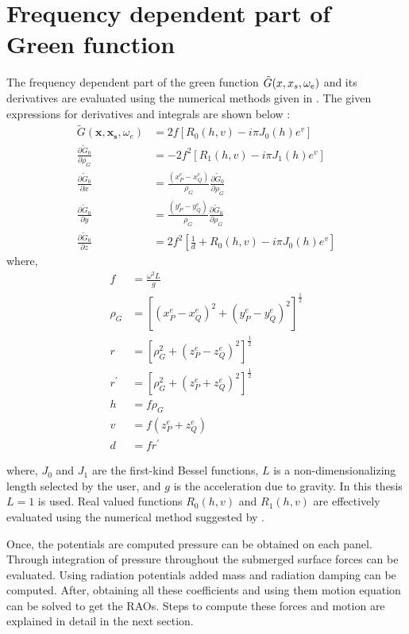 \section{Frequency dependent part of Green function}
The frequency dependent part of the green function $\Tilde{G}(x, x_s, \omega_e)$ 
and its derivatives are evaluated using the numerical methods given in 
\cite{telste1986numerical}. The given expressions for derivatives and integrals 
are shown below : 
\begin{align}
    \tilde{G}(\boldsymbol{x},\boldsymbol{x_s}, \omega_e) &= 2f\left[ R_0(h,v) - i \pi J_0(h)e^{v}\right]\\
    \frac{\partial{\tilde{G}_0}}{\partial{\rho_G}} &= -2f^{2}\left[R_1(h,v)-i\pi J_{1}(h)e^v\right]\\
    \frac{\partial{\tilde{G}_0}}{\partial{x}} &=\frac{(x^e_P-x^e_Q)}{\rho_G}\frac{\partial{\tilde{G}_0}}{\partial{\rho_G}}\\
    \frac{\partial \tilde{G}_{0}}{\partial y} &= \frac{\left(y^e_P-y^e_Q\right)}{\rho_G} \frac{\partial \tilde{G}_{0}}{\partial \rho_G}\\
    \frac{\partial \tilde{G}_{0}}{\partial z} &= 2 f^{2}\left[\frac{1}{d}+R_{0}(h, v)-i \pi J_{0}(h) e^{v}\right]
\end{align}
where, 
\begin{align}
    f &= \frac{\omega^2 L}{g} \\
    \rho_G &= \left[(x^e_P-x^e_Q)^2 + (y^e_P-y^e_Q)^2\right]^{\frac{1}{2}} \\
    r &= \left[\rho^2_G+(z^e_P-z^e_Q)^2\right]^{\frac{1}{2}} \\
    {r}^{\prime}&= \left[\rho^2_G+(z^e_P+z^e_Q)^2\right]^{\frac{1}{2}} \\
    h &= f\rho_G \\
    v &= f(z^e_P+z^e_Q) \\
    d &= f {r}^{\prime}
\end{align}

where, $J_0$ and $J_1$ are the first-kind Bessel functions, $L$ is a non-dimensionalizing length 
selected by the user, 
and $g$ is the acceleration due to gravity. In this thesis $L=1$ is used. 
Real valued functions $R_0(h,v)$ and $R_1(h,v)$ are effectively evaluated 
using the numerical method suggested by \cite{telste1986numerical}.

Once, the potentials are computed pressure can be obtained on each panel.
Through integration of pressure throughout the submerged surface forces can be evaluated. 
Using radiation potentials added mass and radiation damping can be computed. 
After, obtaining all these coefficients and using them motion equation can be solved to get the RAOs.
Steps to compute these forces and motion are explained in detail in the next section.